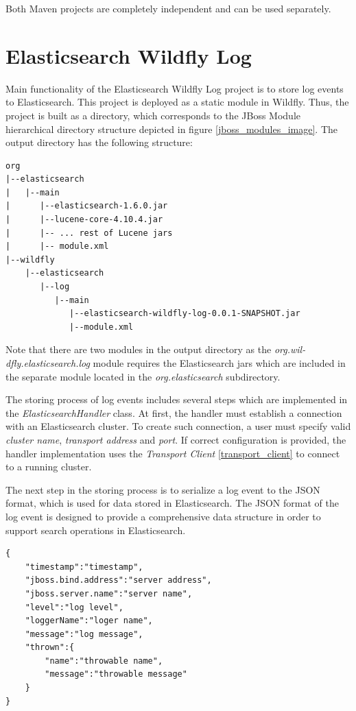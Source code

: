 \documentclass[12pt,oneside]{fithesis2}
\begin{document}
Both Maven projects are completely independent and can be used separately.

\section{Elasticsearch Wildfly Log}
Main functionality of the Elasticsearch Wildfly Log project is to store log events to Elasticsearch. This project is deployed as a static module in Wildfly. Thus, the project is built as a directory, which corresponds to the JBoss Module hierarchical directory structure depicted in figure \ref{jboss_modules_image}. The output directory has the following structure:

\begin{lstlisting}[caption = Elasticsearch Wildfly Log module directory structure, label = elasticsearch_module_structure]
org
|--elasticsearch
|   |--main
|      |--elasticsearch-1.6.0.jar
|      |--lucene-core-4.10.4.jar
|      |-- ... rest of Lucene jars
|      |-- module.xml
|--wildfly
    |--elasticsearch
       |--log
          |--main
             |--elasticsearch-wildfly-log-0.0.1-SNAPSHOT.jar
             |--module.xml
\end{lstlisting}

\noindent
Note that there are two modules in the output directory as the \textit{org.wil-dfly.elasticsearch.log} module requires the Elasticsearch jars which are included in the separate module located in the \textit{org.elasticsearch} subdirectory.

The storing process of log events includes several steps which are implemented in the \textit{ElasticsearchHandler} class. At first, the handler must establish a connection with an Elasticsearch cluster. To create such connection, a user must specify valid \textit{cluster name}, \textit{transport address} and \textit{port}.
If correct configuration is provided, the handler implementation uses the \textit{Transport Client} \ref{transport_client} to connect to a running cluster.

The next step in the storing process is to serialize a log event to the JSON format, which is used for data stored in Elasticsearch. The JSON format of the log event is designed to provide a comprehensive data structure in order to support search operations in Elasticsearch.

\begin{verbatim}
{
	"timestamp":"timestamp",
	"jboss.bind.address":"server address",
	"jboss.server.name":"server name",
	"level":"log level",
	"loggerName":"loger name",
	"message":"log message",
	"thrown":{
		"name":"throwable name",
		"message":"throwable message"
	}
}	
\end{verbatim}
\begin{lstlisting}[aboveskip = 0em, frame = none, caption = JSON format of a log event]
\end{lstlisting}
\end{document}

